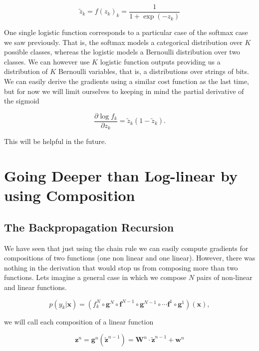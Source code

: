 \begin{equation}
\tilde{z}_k = f(z_k)_k = \frac{1}{1+\exp(-z_k)} 
\label{eq:sigmoid}
\end{equation}

One single logistic function corresponds to a particular case of the softmax case we saw previously. That is, the softmax models a categorical distribution over $K$ possible classes, whereas the logistic models a Bernoulli distribution over two classes. We can however use $K$ logistic function outputs providing us a distribution of $K$ Bernoulli variables, that is, a distributions over strings of bits. We can easily derive the gradients using a similar cost function as the last time, but for now we will limit ourselves to keeping in mind the partial derivative of the sigmoid 

\begin{equation}
\frac{\partial \log f_{k}}{\partial z_{k}} = \tilde{z}_{k} (1-\tilde{z}_{k}).
\label{eq:partsigmoid}
\end{equation}

\noindent This will be helpful in the future.

\section{Going Deeper than Log-linear by using Composition}

\subsection{The Backpropagation Recursion}

We have seen that just using the chain rule we can easily compute gradients for compositions of two functions (one non linear and one linear). However, there was nothing in the derivation that would stop us from composing more than two functions. Lets imagine a general case in which we compose $N$ pairs of non-linear and linear functions.

\begin{equation}
p(y_k|\mathbf{x}) = (f_k^N \circ \mathbf{g}^N \circ \mathbf{f}^{N-1} \circ \mathbf{g}^{N-1} \circ \cdots \mathbf{f}^1 \circ \mathbf{g}^1)(\mathbf{x}),
\end{equation}

\noindent we will call each composition of a linear function

\begin{equation}
\mathbf{z}^n = \mathbf{g}^n(\tilde{\mathbf{z}}^{n-1}) = \mathbf{W}^n \cdot \tilde{\mathbf{z}}^{n-1} + \mathbf{w}^n 
\end{equation}

